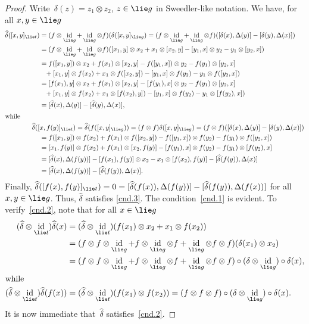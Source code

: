 \documentclass[12pt, reqno]{amsart}
\newcommand{\wh}[1]{\widehat{#1}}
\theoremstyle{definition}
\numberwithin{equation}{section}
\newcommand{\tensor}{\otimes}
\DeclareMathOperator{\id}{id}
\begin{document}
\begin{proof}
Write~$\delta(z)=z_1\tensor z_2$, $z\in\lie g$ in Sweedler-like notation. We have, 
for all $x,y\in \lie g$
\begin{align*}
\wh\delta([x,y]_{\lie t})&=(f\tensor \id_{\lie g}+\id_{\lie g}\tensor f)(\delta([x,y]_{\lie g})=(f\tensor\id_{\lie g}+
\id_{\lie g}\tensor f)([\delta(x),\Delta(y)]-[\delta(y),\Delta(x)])\\
&
=(f\tensor\id_{\lie g}+
\id_{\lie g}\tensor f)([x_1,y]\tensor x_2+x_1\tensor [x_2,y]-[y_1,x]\tensor y_2-y_1\tensor [y_2,x])\\
&=f([x_1,y])\tensor x_2+f(x_1)\tensor [x_2,y]-
f([y_1,x])\tensor y_2-f(y_1)\tensor [y_2,x]
\\
&\phantom{-}+[x_1,y]\tensor f(x_2)+x_1\tensor f([x_2,y])-[y_1,x]\tensor f(y_2)-y_1\tensor f([y_2,x])\\
&=[f(x_1),y]\tensor x_2+f(x_1)\tensor [x_2,y]-
[f(y_1),x]\tensor y_2-f(y_1)\tensor [y_2,x]
\\
&\phantom{-}+[x_1,y]\tensor f(x_2)+x_1\tensor [f(x_2),y])-[y_1,x]\tensor f(y_2)-y_1\tensor [f(y_2),x])\\
&=[\wh\delta(x),\Delta(y)]-[\wh\delta(y),\Delta(x)],
\\
\intertext{while}
\wh\delta([&x,f(y)]_{\lie t})=\wh\delta(f([x,y]_{\lie g}))
=(f\tensor f)\delta([x,y]_{\lie g})=(f\tensor f)([\delta(x),\Delta(y)]-[\delta(y),\Delta(x)])\\
&=f([x_1,y])\tensor f(x_2)+f(x_1)\tensor f([x_2,y])-
f([y_1,x])\tensor f(y_2)-f(y_1)\tensor f([y_2,x]) \\
&=[x_1,f(y)]\tensor f(x_2)+f(x_1)\tensor [x_2,f(y)]
-[f(y_1),x]\tensor f(y_2)-f(y_1)\tensor [f(y_2),x]\\
&=[\wh\delta(x),\Delta(f(y))]-[f(x_1),f(y)]\tensor x_2-
x_1\tensor [f(x_2),f(y)]-[\wh\delta(f(y)),\Delta(x)]\\
&=[\wh\delta(x),\Delta(f(y))]-[\wh\delta(f(y)),\Delta(x)].
\end{align*}
Finally, $\widehat \delta([f(x),f(y)]_{\lie t})=0=[\widehat\delta(f(x)),\Delta(f(y))]-[\widehat\delta(f(y)),\Delta(f(x))]$ for all~$x,y\in\lie g$.
Thus, $\wh\delta$ satisfies 
\ref{cnd.3}. The condition~\ref{cnd.1} is evident. To verify~\ref{cnd.2}, note that for all $x\in\lie g$
\begin{align*}
(\wh\delta\tensor\id_{\lie t})\wh\delta(x)&=
(\wh\delta\tensor\id_{\lie t})(f(x_1)\tensor x_2+x_1\tensor f(x_2))\\
&=(f\tensor f\tensor\id_{\lie g}+f\tensor\id_{\lie g}\tensor f+\id_{\lie g}\tensor f\tensor f)(\delta(x_1)\tensor x_2)\\
&=(f\tensor f\tensor\id_{\lie g}+f\tensor\id_{\lie g}\tensor f+\id_{\lie g}\tensor f\tensor f)\circ(\delta\tensor\id_{\lie g})\circ \delta(x),
\\
\intertext{while}
(\wh\delta\tensor\id_{\lie t})\wh\delta(f(x))
&=(\wh\delta\tensor\id_{\lie t})(f(x_1)\tensor f(x_2))
=(f\tensor f\tensor f)\circ (\delta\tensor\id_{\lie g})\circ\delta(x).
\end{align*}
It is now immediate that~$\wh\delta$ 
satisfies~\ref{cnd.2}.
\end{proof}
\end{document}
